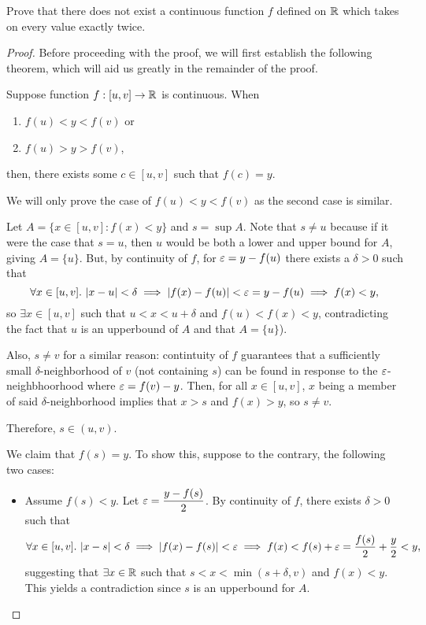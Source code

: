 \begin{problem}
  Prove that there does not exist a continuous function $f$ defined on $\mathbb{R}$ which takes on every value exactly twice.

  \begin{proof}
    Before proceeding with the proof, we will first establish the following
    theorem, which will aid us greatly in the remainder of the proof.

    \begin{theorem}
      \label{thm:intermediate-value-theorem}
      Suppose function $f : [u, v] \to \mathbb{R}$ is continuous. When 
      \begin{enumerate}[label=(\alph*)]
        \item $f(u) < y < f(v)$ or
        \item $f(u) > y > f(v)$,
      \end{enumerate}
      then, there exists some $c \in [u, v]$ such that $f(c) = y$.
    \end{theorem}

    \begin{subproof}
      We will only prove the case of $f(u) < y < f(v)$ as the second case is similar.

      Let $A = \{ x \in [u,v] : f(x) < y \}$ and $s = \sup{A}$.
      Note that $s \neq u$ because if it were the case that $s = u$, then $u$ would be both a lower and upper bound for $A$,
      giving $A = \{ u \}$. But, by continuity of $f$, for $\varepsilon = y - f(u)$ there exists a $\delta > 0$
      such that
      \[
        \forall x \in [u, v].\, \left\lvert x - u \right\rvert < \delta \implies \left\lvert f(x) - f(u) \right\rvert < \varepsilon = y - f(u) \implies f(x) < y,
      \]
      so $\exists x \in [u, v]$ such that $u < x < u + \delta$ and $f(u) < f(x) < y$, contradicting the fact that $u$
      is an upperbound of $A$ and that $A = \{ u \}$).

      Also, $s \neq v$ for a similar reason: contintuity of $f$ guarantees that a sufficiently small $\delta$-neighborhood of $v$
      (not containing $s$) can be found in response to the $\varepsilon$-neighbhoorhood where $\varepsilon = f(v) - y$. Then, for all $x \in [u, v]$,
      $x$ being a member of said $\delta$-neighborhood implies that $x > s$ and $f(x) > y$, so $s \neq v$.

      Therefore, $s \in (u, v)$.

      We claim that $f(s) = y$. To show this, suppose to the contrary, the following two cases:
      \begin{itemize}
        \item Assume $f(s) < y$. Let $\varepsilon = \dfrac{y - f(s)}{2}$. By continuity of $f$, there exists $\delta > 0$ 
          such that
          \[
            \forall x \in [u,v].\, \left\lvert x - s \right\rvert < \delta \implies \left\lvert f(x) - f(s) \right\rvert < \varepsilon \implies f(x) < f(s) + \varepsilon = \frac{f(s)}{2} + \frac{y}{2} < y,
          \]
          suggesting that $\exists x \in \mathbb{R}$ such that $s < x < \min{(s + \delta, v)}$ and $f(x) < y$.
          This yields a contradiction since $s$ is an upperbound for $A$.


\end{itemize}
\end{subproof}
\end{proof}
\end{problem}
